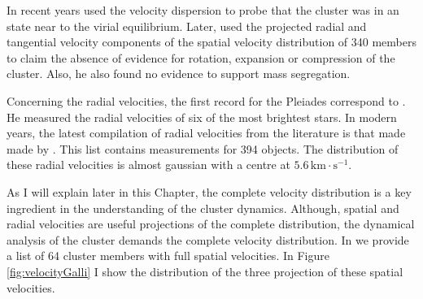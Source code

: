 In recent years \citet{Pinfield1998} used the velocity dispersion to probe that the cluster was in an state near to the virial equilibrium. Later, \citet{2006ARep...50..714L} used the projected radial and tangential velocity components of the spatial velocity distribution of 340 members to claim the absence of evidence for rotation, expansion or compression of the cluster. Also, he also found no evidence to support mass segregation. 

Concerning the radial velocities, the first record for the Pleiades correspond to \citet{1904ApJ....19..338A}. He measured the radial velocities of six of the most brightest stars. In modern years, the latest compilation of radial velocities from the literature is that made made by \citet{Galli2017}. This list contains measurements for 394 objects. The distribution of these radial velocities is almost gaussian with a centre at $5.6\,\mathrm{km \cdot s^{-1}}$. 

As I will explain later in this Chapter, the complete velocity distribution is a key ingredient in the understanding of the cluster dynamics. Although, spatial and radial velocities are useful projections of the complete distribution, the dynamical analysis of the cluster demands the complete velocity distribution. In \citet{Galli2017} we provide a list of 64 cluster members with full spatial velocities. In Figure \ref{fig:velocityGalli}  I show the distribution of the three projection of these spatial velocities. 

